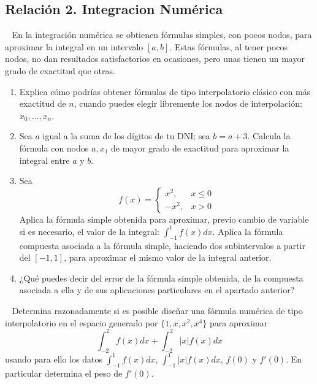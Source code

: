 \subsection{Relación 2. Integracion Numérica}
\setcounter{ejercicio}{0}


\begin{ejercicio}~\label{ej:2.3.1}
    En la integración numérica se obtienen fórmulas simples, con pocos nodos, para aproximar la integral en un intervalo $[a, b]$. Estas fórmulas, al tener pocos nodos, no dan resultados satisfactorios en ocasiones, pero unas tienen un mayor grado de exactitud que otras.
    \begin{enumerate}
        \item Explica cómo podrías obtener fórmulas de tipo interpolatorio clásico con más exactitud de $n$, cuando puedes elegir libremente los nodos de interpolación: $x_0, \ldots, x_n$.
        \item Sea $a$ igual a la suma de los dígitos de tu DNI; sea $b = a + 3$. Calcula la fórmula con nodos $a, x_1$ de mayor grado de exactitud para aproximar la integral entre $a$ y $b$.
        \item Sea
        \begin{equation*}
            f(x) = \begin{cases}
                x^2, & x \leq 0 \\
                -x^2, & x > 0
            \end{cases}
        \end{equation*}
        Aplica la fórmula simple obtenida para aproximar, previo cambio de variable si es necesario, el valor de la integral: $\int_{-1}^{1} f(x)dx$. Aplica la fórmula compuesta asociada a la fórmula simple, haciendo dos subintervalos a partir del $[-1,1]$, para aproximar el mismo valor de la integral anterior.
        \item ¿Qué puedes decir del error de la fórmula simple obtenida, de la compuesta asociada a ella y de sus aplicaciones particulares en el apartado anterior?
    \end{enumerate}
\end{ejercicio}

\begin{ejercicio}~\label{ej:2.3.2}
    Determina razonadamente si es posible diseñar una fórmula numérica de tipo interpolatorio en el espacio generado por $\{1, x, x^2, x^4\}$ para aproximar
    \begin{equation*}
        \int_{-2}^{2} f(x) dx + \int_{-2}^{2} |x|f(x) dx
    \end{equation*}
    usando para ello los datos $\int_{-1}^{1} f(x) dx$, $\int_{-1}^{1} |x|f(x) dx$, $f(0)$ y $f'(0)$. En particular determina el peso de $f'(0)$.
\end{ejercicio}

